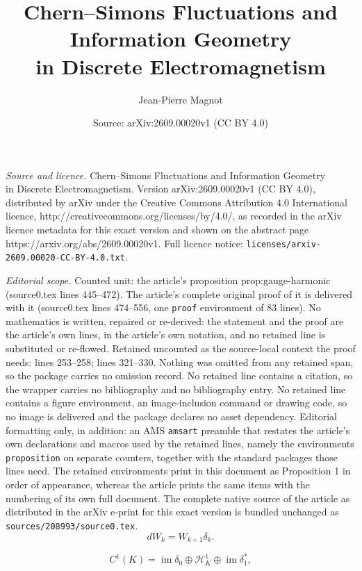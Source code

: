 \documentclass[10pt,a4paper]{amsart}
\title{Chern--Simons Fluctuations and Information Geometry\\ in Discrete Electromagnetism}
\author{Jean-Pierre Magnot}
\date{Source: arXiv:2609.00020v1 (CC BY 4.0)}
\newcommand{\im}{\operatorname{im}}
\begin{document}
\maketitle

\noindent\emph{Source and licence.} Chern--Simons Fluctuations and Information Geometry\\ in Discrete Electromagnetism. Version arXiv:2609.00020v1 (CC BY 4.0), distributed by arXiv under the Creative Commons Attribution 4.0 International licence, http://creativecommons.org/licenses/by/4.0/, as recorded in the arXiv licence metadata for this exact version and shown on the abstract page https://arxiv.org/abs/2609.00020v1. Full licence notice: \texttt{licenses/arxiv-2609.00020-CC-BY-4.0.txt}.\par\smallskip

\noindent\textit{Editorial scope.} Counted unit: the article's proposition prop:gauge-harmonic (source0.tex lines 445--472). The article's complete original proof of it is delivered with it (source0.tex lines 474--556, one \texttt{proof} environment of 83 lines). No mathematics is written, repaired or re-derived: the statement and the proof are the article's own lines, in the article's own notation, and no retained line is substituted or re-flowed.  Retained uncounted as the source-local context the proof needs: lines 253--258; lines 321--330.  Nothing was omitted from any retained span, so the package carries no omission record.  No retained line contains a citation, so the wrapper carries no bibliography and no bibliography entry.  No retained line contains a figure environment, an image-inclusion command or drawing code, so no image is delivered and the package declares no asset dependency.  Editorial formatting only, in addition: an AMS \texttt{amsart} preamble that restates the article's own declarations and macros used by the retained lines, namely the environments \texttt{proposition} on separate counters, together with the standard packages those lines need.  The retained environments print in this document as Proposition 1 in order of appearance, whereas the article prints the same items with the numbering of its own full document.  The complete native source of the article as distributed in the arXiv e-print for this exact version is bundled unchanged as \texttt{sources/208993/source0.tex}.
\begin{equation}
dW_k
=
W_{k+1}\delta_k.
\label{eq:whitney-commutation}
\end{equation}

\begin{equation}
C^1(K)
=
\im\delta_0
\oplus
\mathcal H_K^1
\oplus
\im\delta_1^\ast,
\label{eq:hodge}
\end{equation}
\end{document}
